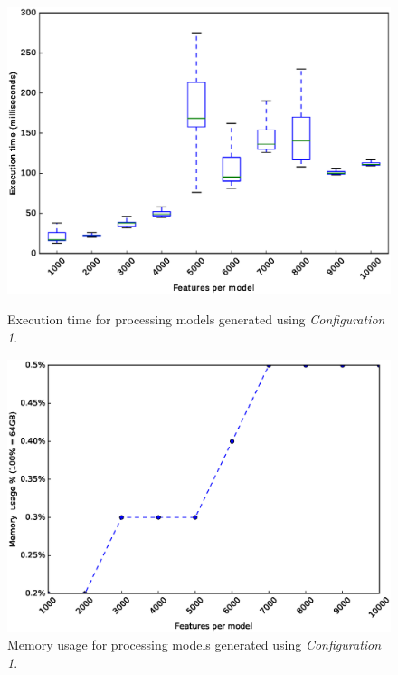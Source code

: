 \begin{figure}[h]
        \centering
        \begin{minipage}[b]{0.48\textwidth}
                \includegraphics[width=\textwidth]{boxplot_0_1.eps}
                \caption{Execution time for processing models generated using \textit{Configuration 1}.}\label{fig:plot:probs:boxplot_0_1}
        \end{minipage}
        \hfill
        \begin{minipage}[b]{0.48\textwidth}
                \includegraphics[width=\textwidth]{boxplot_0_1_mem.eps}
                \caption{Memory usage for processing models generated using \textit{Configuration 1}.}\label{fig:plot:probs:boxplot_0_1_mem}
        \end{minipage}
\end{figure}

